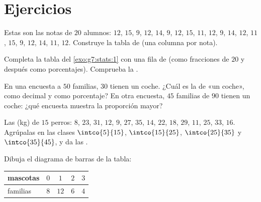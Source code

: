 \section{Ejercicios}

\begin{exercise}[$\star$]\label{exo:g7:stats:1}
Estas son las notas de $20$ alumnos: $12$, $15$, $9$, $12$, $14$,
$9$, $12$, $15$, $11$, $12$, $9$, $14$, $12$, $11$, $15$, $9$, $12$,
$14$, $11$, $12$. Construye la tabla de  (una columna por nota).
\end{exercise}

\begin{exercise}[$\star$]\label{exo:g7:stats:2}
Completa la tabla del \cref{exo:g7:stats:1} con una fila de 
(como fracciones de $20$ y después como porcentajes). Comprueba la .
\end{exercise}

\begin{exercise}[$\star$]\label{exo:g7:stats:3}
En una encuesta a $50$ familias, $30$ tienen un coche. ¿Cuál es la
 de «un coche», como decimal y como porcentaje? En otra
encuesta, $45$ familias de $90$ tienen un coche: ¿qué encuesta muestra
la proporción mayor?
\end{exercise}

\begin{exercise}[$\star$]\label{exo:g7:stats:4}
Las  (kg) de $15$ perros: $8$, $23$, $31$, $12$, $9$, $27$, $35$,
$14$, $22$, $18$, $29$, $11$, $25$, $33$, $16$. Agrúpalas en las
clases $\intco{5}{15}$, $\intco{15}{25}$, $\intco{25}{35}$ y
$\intco{35}{45}$, y da las .
\end{exercise}

\begin{exercise}[$\star$]\label{exo:g7:stats:5}
Dibuja el diagrama de barras de la tabla:
\begin{center}
\renewcommand{\arraystretch}{1.2}
\begin{tabular}{l|cccc}
mascotas & $0$ & $1$ & $2$ & $3$ \\
\hline
familias & $8$ & $12$ & $6$ & $4$ \\
\end{tabular}
\end{center}
\end{exercise}

